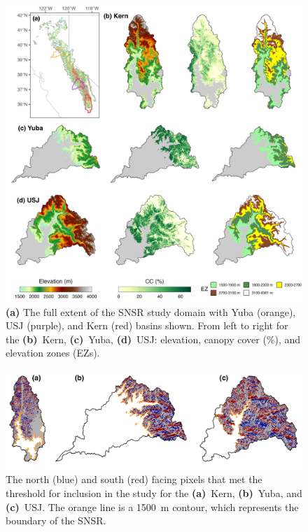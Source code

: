 \begin{figure}[t]
\centering
\includegraphics[width=14cm]{figures/ch2_figs/kuy_study_area_v2.png}
\caption{\textbf{(a)} The full extent of the SNSR study domain with Yuba (orange), USJ (purple), and Kern (red) basins shown. From left to right for the \textbf{(b)}~Kern, \textbf{(c)}~Yuba, \textbf{(d)}~USJ: elevation, canopy cover (\%), and elevation zones (EZs).}
\label{kuy_study_area}
\end{figure}

\begin{figure}[t]
\centering
\includegraphics[width=\textwidth]{figures/ch2_figs/kuy_snow_metric_area_v2.png}
\caption{The north (blue) and south (red) facing pixels that met the threshold for inclusion in the study for the \textbf{(a)}~Kern, \textbf{(b)}~Yuba, and \textbf{(c)}~USJ. The orange line is a 1500~m contour, which represents the boundary of the SNSR.}
\label{fig:kuy_snow_metric_area}
\end{figure}



